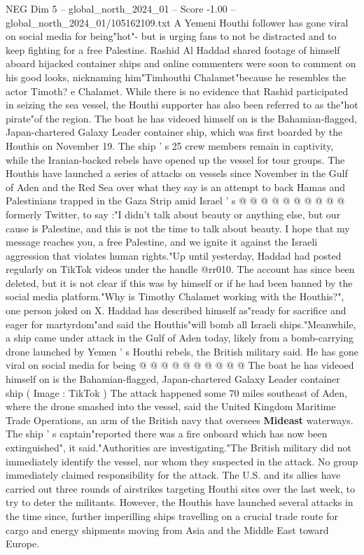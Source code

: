 \begin{textsample}{NEG Dim 5 – global\_north\_2024\_01 – Score -1.00 – global\_north\_2024\_01/105162109.txt}  \label{ex:f5_neg_348}
A Yemeni Houthi follower has gone viral on social media for being"hot"- but is urging fans to not be distracted and to keep fighting for a free Palestine.
Rashid Al Haddad shared footage of himself aboard hijacked container ships and online commenters were soon to comment on his good looks, nicknaming him"Timhouthi Chalamet"because he resembles the actor Timoth? e Chalamet.
While there is no evidence that Rashid participated in seizing the sea vessel, the Houthi supporter has also been referred to as the"hot pirate"of the region.
The boat he has videoed himself on is the Bahamian-flagged, Japan-chartered Galaxy Leader container ship, which was first boarded by the Houthis on November 19.
The ship ' s 25 crew members remain in captivity, while the Iranian-backed rebels have opened up the vessel for tour groups.
The Houthis have launched a series of attacks on vessels since November in the Gulf of Aden and the Red Sea over what they say is an attempt to back Hamas and Palestinians trapped in the Gaza Strip amid Israel ' s @ @ @ @ @ @ @ @ @ @ formerly Twitter, to say :"I didn't talk about beauty or anything else, but our cause is Palestine, and this is not the time to talk about beauty.
I hope that my message reaches you, a free Palestine, and we ignite it against the Israeli aggression that violates human rights."Up until yesterday, Haddad had posted regularly on TikTok videos under the handle @rr010.
The account has since been deleted, but it is not clear if this was by himself or if he had been banned by the social media platform."Why is Timothy Chalamet working with the Houthis?", one person joked on X.
Haddad has described himself as"ready for sacrifice and eager for martyrdom"and said the Houthis"will bomb all Israeli ships."Meanwhile, a ship came under attack in the Gulf of Aden today, likely from a bomb-carrying drone launched by Yemen ' s Houthi rebels, the British military said.
He has gone viral on social media for being @ @ @ @ @ @ @ @ @ @ The boat he has videoed himself on is the Bahamian-flagged, Japan-chartered Galaxy Leader container ship ( Image : TikTok ) The attack happened some 70 miles southeast of Aden, where the drone smashed into the vessel, said the United Kingdom Maritime Trade Operations, an arm of the British navy that oversees \textbf{Mideast} waterways.
The ship ' s captain"reported there was a fire onboard which has now been extinguished", it said."Authorities are investigating."The British military did not immediately identify the vessel, nor whom they suspected in the attack.
No group immediately claimed responsibility for the attack.
The U.S. and its allies have carried out three rounds of airstrikes targeting Houthi sites over the last week, to try to deter the militants.
However, the Houthis have launched several attacks in the time since, further imperilling ships travelling on a crucial trade route for cargo and energy shipments moving from Asia and the Middle East toward Europe.

\end{textsample}
